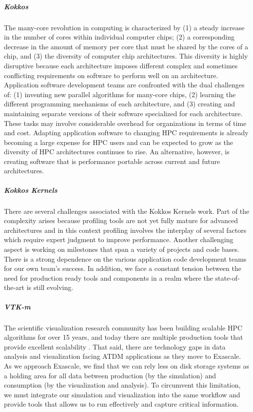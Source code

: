 \subparagraph{Kokkos} The many-core revolution in computing is characterized by
(1) a steady increase in the number of cores within individual computer chips;
(2) a corresponding decrease in the amount of memory per core that must be shared by the cores of a chip, and
(3) the diversity of computer chip architectures.
This diversity is highly disruptive because each architecture imposes different complex
and sometimes conflicting requirements on software to perform well on an architecture.
Application software development teams are confronted with the dual challenges of:
(1) inventing new parallel algorithms for many-core chips,
(2) learning the different programming mechanisms of each architecture, and
(3) creating and maintaining separate versions of their software specialized for each architecture.
These tasks may involve considerable overhead for organizations in terms of time and cost.
Adapting application software to changing HPC requirements is already becoming a large expense for
HPC users and can be expected to grow as the diversity of HPC architectures continues to rise.
An alternative, however, is creating software that is performance portable across current and future architectures.

\subparagraph{Kokkos Kernels} There are several challenges associated with the Kokkos Kernels work. Part of the complexity arises because profiling tools are not yet fully mature for advanced architectures and in this context profiling involves the interplay of several factors which require expert judgment to improve performance.  Another challenging aspect is working on milestones that span a variety of projects and code bases. There is a strong dependence on the various application code development teams for our own team's success. In addition, we face a constant tension between the need for production ready tools and components in a realm where the state-of-the-art is still evolving.

\subparagraph{VTK-m} The scientific visualization research community has been building scalable HPC algorithms for over 15 years, and today there are multiple production tools that provide excellent scalability \cite{ParaView,Catalyst}. That said, there are technology gaps in data analysis and visualization facing ATDM applications as they move to Exascale.  As we approach Exascale, we find that we can rely less on disk storage systems as a holding area for all data between production (by the simulation) and consumption (by the visualization and analysis). To circumvent this limitation, we must integrate our simulation and visualization into the same workflow and provide tools that allows us to run effectively and capture critical information.

